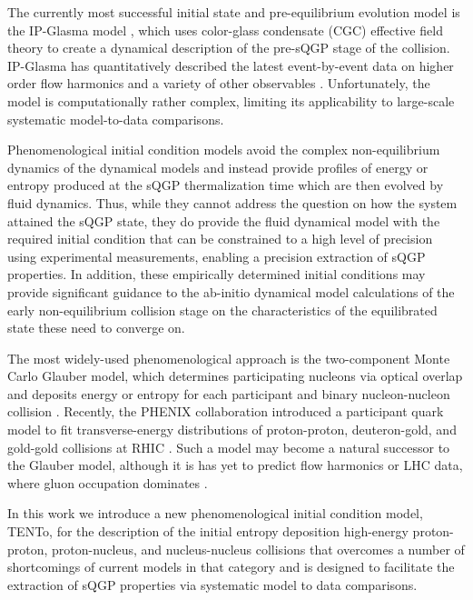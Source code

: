 \documentclass[aps,prc,reprint,amsmath,nofootinbib]{revtex4-1}
\newcommand{\trento}{T\raisebox{-.5ex}{R}ENTo}
\begin{document}
The currently most successful initial state and pre-equilibrium evolution model is the IP-Glasma model \cite{Schenke:2012wb}, which uses color-glass condensate (CGC) effective field theory \cite{McLerran:1993ni,McLerran:1993ka,Gelis:2010nm} to create a dynamical description of the pre-sQGP stage of the collision.
IP-Glasma has quantitatively described the latest event-by-event data on higher order flow harmonics and a variety of other observables \cite{Schenke:2014zha}.
Unfortunately, the model is computationally rather complex, limiting its applicability to large-scale systematic model-to-data comparisons.

Phenomenological initial condition models avoid the complex non-equilibrium dynamics of the dynamical models and instead provide profiles of energy or entropy produced at the sQGP thermalization time which are then evolved by fluid dynamics. Thus, while they cannot address the question on how the system attained the sQGP state, they do provide the fluid dynamical model with the required initial condition that can be constrained to a high level of precision using experimental measurements, enabling a precision extraction of sQGP properties. In addition, these empirically determined initial conditions may provide significant guidance to the ab-initio dynamical model calculations of the early non-equilibrium collision stage on the characteristics of the equilibrated state these need to converge on.

The most widely-used phenomenological approach is the two-component Monte Carlo Glauber model, which determines participating nucleons via optical overlap and deposits energy or entropy for each participant and binary nucleon-nucleon collision \cite{Miller:2007ri}.
Recently, the PHENIX collaboration introduced a participant quark model to fit  transverse-energy distributions of proton-proton, deuteron-gold, and gold-gold collisions at RHIC \cite{Adler:2013aqf}.
Such a model may become a natural successor to the Glauber model, although it is has yet to predict flow harmonics or LHC data, where gluon occupation dominates \cite{}.

In this work we introduce a new phenomenological initial condition model, \trento, for the description of the initial entropy deposition high-energy proton-proton, proton-nucleus, and nucleus-nucleus collisions that overcomes a number of shortcomings of current models in that category and is designed to facilitate the extraction of sQGP properties via systematic model to data comparisons.
\end{document}
